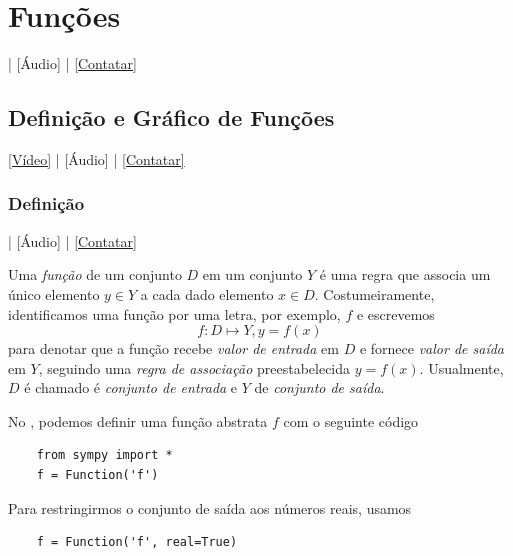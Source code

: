 
\chapter{Funções}\label{cap_funcao}
\thispagestyle{fancy}

\begin{flushright}
  [Vídeo] | [Áudio] | \href{https://phkonzen.github.io/notas/contato.html}{[Contatar]}
\end{flushright}

\section{Definição e Gráfico de Funções}\label{cap_funcao_sec_defgrafico}

\begin{flushright}
  \href{https://archive.org/details/fundef}{[Vídeo]} | [Áudio] | \href{https://phkonzen.github.io/notas/contato.html}{[Contatar]}
\end{flushright}

\subsection{Definição}

\begin{flushright}
  [Vídeo] | [Áudio] | \href{https://phkonzen.github.io/notas/contato.html}{[Contatar]}
\end{flushright}

Uma \emph{função} de um conjunto $D$ em um conjunto $Y$ é uma regra que associa um único elemento $y\in Y$ a cada dado elemento $x\in D$. Costumeiramente, identificamos uma função por uma letra, por exemplo, $f$ e escrevemos
\begin{equation}
  f:D\mapsto Y, y=f(x)
\end{equation}
para denotar que a função recebe \emph{valor de entrada} em $D$ e fornece \emph{valor de saída} em $Y$, seguindo uma \emph{regra de associação} preestabelecida $y=f(x)$. Usualmente, $D$ é chamado é \emph{conjunto de entrada} e $Y$ de \emph{conjunto de saída}.

\ifispython
\begin{obs}
  No \python, podemos definir uma função abstrata $f$ com o seguinte código
  \begin{lstlisting}
    from sympy import *
    f = Function('f')
  \end{lstlisting}
  Para restringirmos o conjunto de saída aos números reais, usamos
  \begin{lstlisting}
    f = Function('f', real=True)
  \end{lstlisting}  
\end{obs}
\fi

